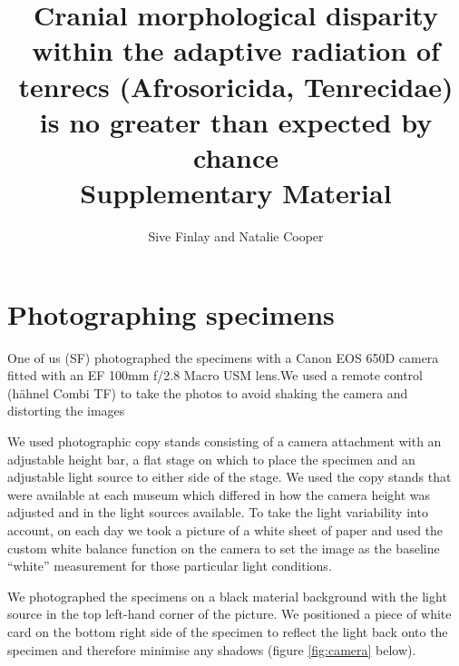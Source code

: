 \documentclass[12pt,a4paper]{article}
\begin{document}
\title{
       Cranial morphological disparity within the adaptive radiation of tenrecs (Afrosoricida, Tenrecidae) is no greater than expected by chance\\
       \bigskip
       Supplementary Material }
\author{Sive Finlay and Natalie Cooper}
\date{}
\maketitle

\linespread{1.6}



\section{Photographing specimens}
One of us (SF) photographed the specimens with a Canon EOS 650D camera fitted with an EF 100mm f/2.8 Macro USM lens.We used a remote control (h\"ahnel Combi TF) to take the photos to avoid shaking the camera and distorting the images

We used photographic copy stands consisting of a camera attachment with an adjustable height bar, a flat stage on which to place the specimen and an adjustable light source to either side of the stage. We used the copy stands that were available at each museum which differed in how the camera height was adjusted and in the light sources available.
To take the light variability into account, on each day we took a picture of a white sheet of paper and used the custom white balance function on the camera to set the image as the baseline “white” measurement for those particular light conditions.

We photographed the specimens on a black material background with the light source in the top left-hand corner of the picture. We positioned a piece of white card on the bottom right side of the specimen to reflect the light back onto the specimen and therefore minimise any shadows (figure \ref{fig:camera} below).
\end{document}
